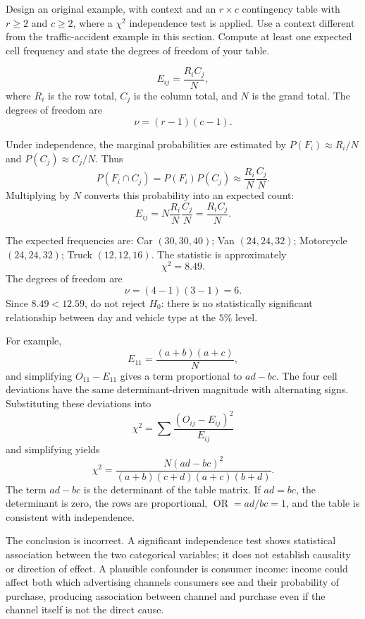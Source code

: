 \begin{problema}\label{prob:a5524c8}
Design an original example, with context and an $r\times c$ contingency table with $r\ge2$ and $c\ge2$, where a $\chi^2$ independence test is applied. Use a context different from the traffic-accident example in this section. Compute at least one expected cell frequency and state the degrees of freedom of your table.
\end{problema}

\begin{solproblema}[prob:d20c80f]
\[
	E_{ij}=\frac{R_iC_j}{N},
\]
where $R_i$ is the row total, $C_j$ is the column total, and $N$ is the grand total. The degrees of freedom are
\[
	\nu=(r-1)(c-1).
\]
\end{solproblema}

\begin{solproblema}[prob:b002759]
Under independence, the marginal probabilities are estimated by $P(F_i)\approx R_i/N$ and $P(C_j)\approx C_j/N$. Thus
\[
	P(F_i\cap C_j)=P(F_i)P(C_j)\approx\frac{R_i}{N}\frac{C_j}{N}.
\]
Multiplying by $N$ converts this probability into an expected count:
\[
	E_{ij}=N\frac{R_i}{N}\frac{C_j}{N}=\frac{R_iC_j}{N}.
\]
\end{solproblema}

\begin{solproblema}[prob:147e151]
The expected frequencies are: Car $(30,30,40)$; Van $(24,24,32)$; Motorcycle $(24,24,32)$; Truck $(12,12,16)$. The statistic is approximately
\[
	\chi^2=8.49.
\]
The degrees of freedom are
\[
	\nu=(4-1)(3-1)=6.
\]
Since $8.49<12.59$, do not reject $H_0$: there is no statistically significant relationship between day and vehicle type at the $5\%$ level.
\end{solproblema}

\begin{solproblema}[prob:3c6b064]
For example,
\[
	E_{11}=\frac{(a+b)(a+c)}{N},
\]
and simplifying $O_{11}-E_{11}$ gives a term proportional to $ad-bc$. The four cell deviations have the same determinant-driven magnitude with alternating signs. Substituting these deviations into
\[
	\chi^2=\sum\frac{(O_{ij}-E_{ij})^2}{E_{ij}}
\]
and simplifying yields
\[
	\chi^2=\frac{N(ad-bc)^2}{(a+b)(c+d)(a+c)(b+d)}.
\]
The term $ad-bc$ is the determinant of the table matrix. If $ad=bc$, the determinant is zero, the rows are proportional, $\operatorname{OR}=ad/bc=1$, and the table is consistent with independence.
\end{solproblema}

\begin{solproblema}[prob:878a46f]
The conclusion is incorrect. A significant independence test shows statistical association between the two categorical variables; it does not establish causality or direction of effect. A plausible confounder is consumer income: income could affect both which advertising channels consumers see and their probability of purchase, producing association between channel and purchase even if the channel itself is not the direct cause.
\end{solproblema}

